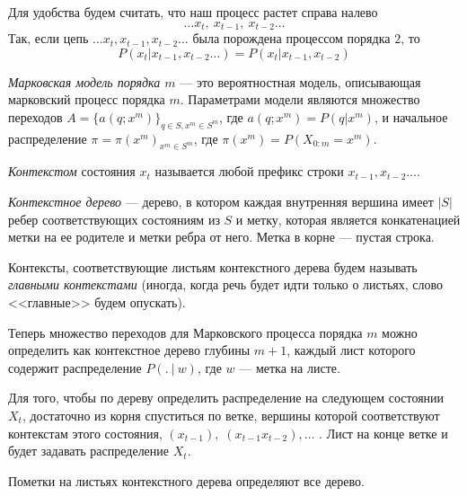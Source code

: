 \documentclass{matmex-diploma-custom}
\begin{document}
Для удобства будем считать, что наш процесс растет справа налево  
$$\ldots x_{t},~ x_{t-1},~ x_{t-2} \ldots$$
Так,  если цепь $\ldots x_{t}, x_{t-1}, x_{t-2} \ldots$ была порождена процессом порядка $2$,
то $$P(x_{t}| x_{t-1},x_{t-2}\ldots) = P(x_{t}|x_{t-1},x_{t-2})$$

\begin{definition} \emph{Марковская модель порядка $ m $} --- это вероятностная модель, описывающая марковский процесс порядка $m$. Параметрами модели являются множество переходов  $ A = \{a(q; x^{m})\}_{q \in S, x^{m} \in S^{m}}$, где $a(q; x^{m}) = P(q|x^{m})$, и начальное распределение $\pi = \pi(x^m)_{x^m \in S^m}$, где $\pi(x^m) = P(X_{0:m}=x^m)$.
\end{definition}

\textit{Контекстом} состояния $ x_{t} $  называется любой префикс строки  $x_{t-1}, x_{t-2} \ldots$. 

\begin{definition}
\textit{Контекстное дерево} --- дерево, в котором каждая внутренняя вершина имеет $ |S| $ ребер соответствующих состояниям из $S$ и метку, которая является конкатенацией метки на ее родителе и метки ребра от него. Метка в корне --- пустая строка.
\end{definition}
Контексты, соответствующие листьям контекстного дерева будем называть \textit{главными контекстами} (иногда, когда речь будет идти только о листьях, слово <<главные>> будем опускать).

Теперь множество переходов для Марковского процесса порядка $ m $ можно определить как контекстное дерево глубины $ m+1 $, каждый лист которого содержит распределение $P(.~|~w)$, где $ w $ --- метка на листе.

Для того, чтобы по дереву определить распределение на следующем состоянии $ X_{t} $, достаточно из корня спуститься по ветке, вершины которой соответствуют контекстам этого состояния, $(x_{t-1}),\; (x_{t-1}x_{t-2}), \ldots$ . Лист на конце ветке и будет задавать распределение $ X_{t} $.


\begin{remark}
Пометки на листьях контекстного дерева определяют все дерево.
\end{remark}
\end{document}

